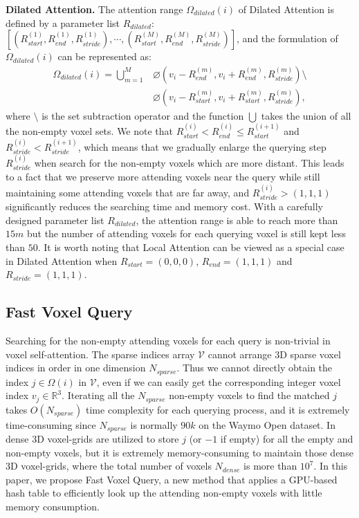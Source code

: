 \documentclass[10pt,twocolumn,letterpaper]{article}
\begin{document}
\textbf{Dilated Attention.} The attention range $\Omega_{dilated}(i)$ of Dilated Attention is defined by a parameter list $R_{dilated}$: $[(R^{(1)}_{start}, R^{(1)}_{end}, R^{(1)}_{stride}),\cdots,(R^{(M)}_{start}, R^{(M)}_{end}, R^{(M)}_{stride})]$, and the formulation of $\Omega_{dilated}(i)$ can be represented as:
\begin{equation} \label{3.1.6}
\begin{aligned}
    \Omega_{dilated}(i) =\bigcup^{M}_{m=1} & \varnothing(v_{i} - R^{(m)}_{end}, v_{i} + R^{(m)}_{end}, R^{(m)}_{stride}) \setminus \\& \varnothing(v_{i} - R^{(m)}_{start}, v_{i} + R^{(m)}_{start}, R^{(m)}_{stride}),
\end{aligned}
\end{equation}
where $\setminus$ is the set subtraction operator and the function $\bigcup$ takes the union of all the non-empty voxel sets. We note that $R^{(i)}_{start} < R^{(i)}_{end}\leq R^{(i+1)}_{start}$ and $R^{(i)}_{stride} < R^{(i+1)}_{stride}$, which means that we gradually enlarge the querying step $R^{(i)}_{stride}$ when search for the non-empty voxels which are more distant. This leads to a fact that we preserve more attending voxels near the query while still maintaining some attending voxels that are far away, and $R^{(i)}_{stride} > (1,1,1)$ significantly reduces the searching time and memory cost. With a carefully designed parameter list $R_{dilated}$, the attention range is able to reach more than $15m$ but the number of attending voxels for each querying voxel is still kept less than $50$. It is worth noting that Local Attention can be viewed as a special case in Dilated Attention when $R_{start}=(0,0,0)$, $R_{end}=(1,1,1)$ and $R_{stride}=(1,1,1)$.



\subsection{Fast Voxel Query}
Searching for the non-empty attending voxels for each query is non-trivial in voxel self-attention. The sparse indices array $\mathcal{V}$ cannot arrange 3D sparse voxel indices in order in one dimension $N_{sparse}$. Thus we cannot directly obtain the index $j \in \Omega(i)$ in $\mathcal{V}$,
even if we can easily get the corresponding integer voxel index $v_{j} \in \mathbb{R}^{3}$. Iterating all the $N_{sparse}$ non-empty voxels to find the matched $j$ takes $O(N_{sparse})$ time complexity for each querying process, and it is extremely time-consuming since $N_{sparse}$ is normally $90k$ on the Waymo Open dataset. In~\cite{deng2020voxel} dense 3D voxel-grids are utilized to store $j$ (or $-1$ if empty) for all the empty and non-empty voxels, but it is extremely memory-consuming to maintain those dense 3D voxel-grids, where the total number of voxels $N_{dense}$ is more than $10^{7}$. In this paper, we propose Fast Voxel Query, a new method that applies a GPU-based hash table to efficiently look up the attending non-empty voxels with little memory consumption.  
\end{document}
